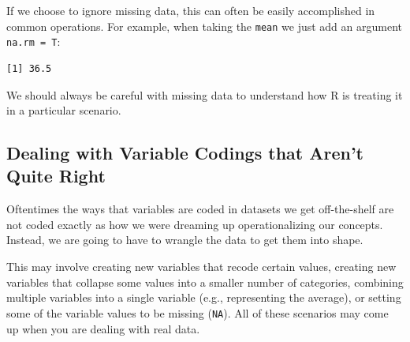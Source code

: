 \documentclass[
  letterpaper,
  DIV=11,
  numbers=noendperiod]{scrreprt}
\newenvironment{Shaded}{\begin{snugshade}}{\end{snugshade}}
\newcommand{\AttributeTok}[1]{\textcolor[rgb]{0.40,0.45,0.13}{#1}}
\newcommand{\ConstantTok}[1]{\textcolor[rgb]{0.56,0.35,0.01}{#1}}
\newcommand{\DecValTok}[1]{\textcolor[rgb]{0.68,0.00,0.00}{#1}}
\newcommand{\DocumentationTok}[1]{\textcolor[rgb]{0.37,0.37,0.37}{\textit{#1}}}
\newcommand{\FunctionTok}[1]{\textcolor[rgb]{0.28,0.35,0.67}{#1}}
\newcommand{\NormalTok}[1]{\textcolor[rgb]{0.00,0.23,0.31}{#1}}
\newcommand{\OtherTok}[1]{\textcolor[rgb]{0.00,0.23,0.31}{#1}}
\newcommand{\SpecialCharTok}[1]{\textcolor[rgb]{0.37,0.37,0.37}{#1}}
\begin{document}
If we choose to ignore missing data, this can often be easily
accomplished in common operations. For example, when taking the
\texttt{mean} we just add an argument \texttt{na.rm\ =\ T}:

\begin{Shaded}
\end{Shaded}

\begin{verbatim}
[1] 36.5
\end{verbatim}

We should always be careful with missing data to understand how R is
treating it in a particular scenario.

\hypertarget{dealing-with-variable-codings-that-arent-quite-right}{%
\subsection{Dealing with Variable Codings that Aren't Quite
Right}\label{dealing-with-variable-codings-that-arent-quite-right}}

Oftentimes the ways that variables are coded in datasets we get
off-the-shelf are not coded exactly as how we were dreaming up
operationalizing our concepts. Instead, we are going to have to wrangle
the data to get them into shape.

This may involve creating new variables that recode certain values,
creating new variables that collapse some values into a smaller number
of categories, combining multiple variables into a single variable
(e.g., representing the average), or setting some of the variable values
to be missing (\texttt{NA}). All of these scenarios may come up when you
are dealing with real data.

\begin{Shaded}
\end{Shaded}
\end{document}

